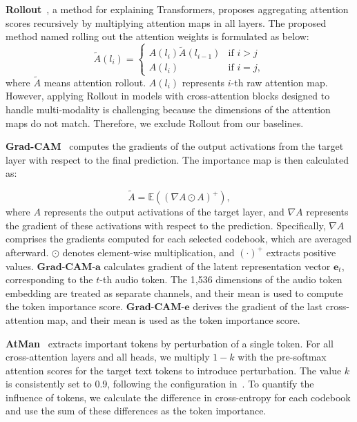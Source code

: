 \textbf{Rollout}~\cite{abnar2020quantifying}, a method for explaining Transformers, proposes aggregating attention scores recursively by multiplying attention maps in all layers. The proposed method named rolling out the attention weights is formulated as below:
\begin{equation}
\tilde{A}(l_i) = 
\begin{cases} 
A(l_i)\tilde{A}(l_{i-1}) & \text{if } i > j \\ 
A(l_i) & \text{if } i = j,
\end{cases}
\end{equation}
\noindent where $\tilde{A}$ means attention rollout. $A(l_i)$ represents ${i}$-th raw attention map. However, applying Rollout in models with cross-attention blocks designed to handle multi-modality is challenging because the dimensions of the attention maps do not match. Therefore, we exclude Rollout from our baselines. 

\textbf{Grad-CAM}~\cite{selvaraju2017grad} computes the gradients of the output activations from the target layer with respect to the final prediction. The importance map is then calculated as:

\begin{equation}
\tilde{A} = \mathbb{E}((\nabla A \odot A)^{+}),
\end{equation}
where $A$ represents the output activations of the target layer, and $\nabla A$ represents the gradient of these activations with respect to the prediction. Specifically, $\nabla A$ comprises the gradients computed for each selected codebook, which are averaged afterward. $\odot$ denotes element-wise multiplication, and $(\cdot)^{+}$ extracts positive values. 
$\textbf{Grad-CAM-a}$ calculates gradient of the latent representation vector $\textbf{e}_t$, corresponding to the $t$-th audio token. The 1,536 dimensions of the audio token embedding are treated as separate channels, and their mean is used to compute the token importance score. $\textbf{Grad-CAM-e}$ derives the gradient of the last cross-attention map, and their mean is used as the token importance score.

\textbf{AtMan}~\cite{deiseroth2023atman} extracts important tokens by perturbation of a single token. For all cross-attention layers and all heads, we multiply \(1-k\) with the pre-softmax attention scores for the target text tokens to introduce perturbation. The value $k$ is consistently set to 0.9, following the configuration in~\cite{deiseroth2023atman}. To quantify the influence of tokens, we calculate the difference in cross-entropy for each codebook and use the sum of these differences as the token importance.

